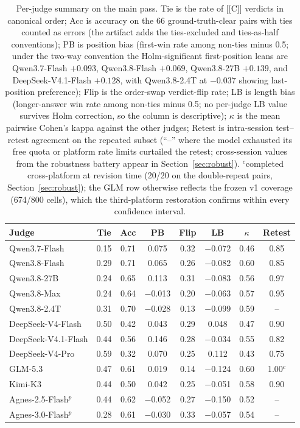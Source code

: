 \documentclass[review,12pt]{elsarticle}
\begin{document}
\begin{table}[t]
\centering
\small
\caption{Per-judge summary on the main pass. Tie is the rate of [[C]]
verdicts in canonical order; Acc is accuracy on the 66 ground-truth-clear
pairs with ties counted as errors (the artifact adds the ties-excluded and
ties-as-half conventions); PB is position bias (first-win rate among
non-ties minus 0.5; under the two-way convention the Holm-significant
first-position leans are Qwen3.7-Flash $+0.093$, Qwen3.8-Flash $+0.069$,
Qwen3.8-27B $+0.139$, and DeepSeek-V4.1-Flash $+0.128$, with
Qwen3.8-2.4T at $-0.037$ showing last-position preference); Flip is the
order-swap verdict-flip rate; LB is length bias (longer-answer win rate
among non-ties minus 0.5; no per-judge LB value survives Holm correction,
so the column is descriptive); $\kappa$ is the mean pairwise Cohen's
kappa against the other judges; Retest is intra-session test--retest
agreement on the repeated subset (``--'' where the model exhausted its
free quota or platform rate limits curtailed the retest; cross-session
values from the robustness battery appear in
Section~\ref{sec:robust}). $^{c}$completed cross-platform at revision
time (20/20 on the double-repeat pairs, Section~\ref{sec:robust}); the
GLM row otherwise reflects the frozen v1 coverage (674/800 cells), which
the third-platform restoration confirms within every confidence
interval.}
\label{tab:summary}
\begin{tabular}{lccccccc}
\toprule
Judge & Tie & Acc & PB & Flip & LB & $\kappa$ & Retest \\
\midrule
Qwen3.7-Flash & 0.15 & 0.71 & 0.075 & 0.32 & $-$0.072 & 0.46 & 0.85 \\
Qwen3.8-Flash & 0.29 & 0.71 & 0.065 & 0.26 & $-$0.082 & 0.60 & 0.85 \\
Qwen3.8-27B & 0.24 & 0.65 & 0.113 & 0.31 & $-$0.083 & 0.56 & 0.97 \\
Qwen3.8-Max & 0.24 & 0.64 & $-$0.013 & 0.20 & $-$0.063 & 0.57 & 0.95 \\
Qwen3.8-2.4T & 0.31 & 0.70 & $-$0.028 & 0.13 & $-$0.099 & 0.59 & -- \\
DeepSeek-V4-Flash & 0.50 & 0.42 & 0.043 & 0.29 & 0.048 & 0.47 & 0.90 \\
DeepSeek-V4.1-Flash & 0.44 & 0.56 & 0.146 & 0.28 & $-$0.034 & 0.55 & 0.82 \\
DeepSeek-V4-Pro & 0.59 & 0.32 & 0.070 & 0.25 & 0.112 & 0.43 & 0.75 \\
GLM-5.3 & 0.47 & 0.61 & 0.019 & 0.14 & $-$0.124 & 0.60 & 1.00$^{c}$ \\
Kimi-K3 & 0.44 & 0.50 & 0.042 & 0.25 & $-$0.051 & 0.58 & 0.90 \\
\midrule
Agnes-2.5-Flash$^{p}$ & 0.44 & 0.62 & $-$0.052 & 0.27 & $-$0.150 & 0.52 & -- \\
Agnes-3.0-Flash$^{p}$ & 0.28 & 0.61 & $-$0.030 & 0.33 & $-$0.057 & 0.54 & -- \\
\bottomrule
\end{tabular}
\end{table}
\end{document}
